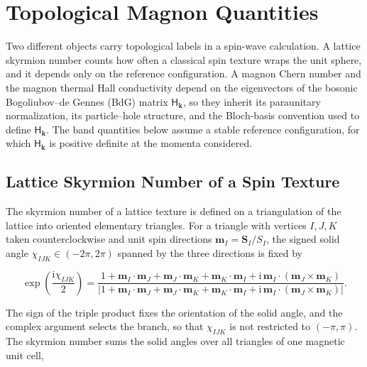 
\hypertarget{sec-lswt-topological-magnon-quantities}{%
\section{Topological Magnon Quantities}\label{sec-lswt-topological-magnon-quantities}}

Two different objects carry topological labels in a spin-wave calculation. A lattice skyrmion number counts how often a classical spin texture wraps the unit sphere, and it depends only on the reference configuration. A magnon Chern number and the magnon thermal Hall conductivity depend on the eigenvectors of the bosonic Bogoliubov--de Gennes (BdG) matrix \(\mathsf H_{\mathbf k}\), so they inherit its paraunitary normalization, its particle--hole structure, and the Bloch-basis convention used to define \(\mathsf H_{\mathbf k}\). The band quantities below assume a stable reference configuration, for which \(\mathsf H_{\mathbf k}\) is positive definite at the momenta considered.

\subsection{Lattice Skyrmion Number of a Spin Texture}

The skyrmion number of a lattice texture is defined on a triangulation of the lattice into oriented elementary triangles. For a triangle with vertices \(I,J,K\) taken counterclockwise and unit spin directions \(\mathbf m_I=\mathbf S_I/S_I\), the signed solid angle \(\chi_{IJK}\in(-2\pi,2\pi)\) spanned by the three directions is fixed by

\[
\exp\!\left(\frac{\mathrm i\chi_{IJK}}{2}\right)
=\frac{1+\mathbf m_I\cdot\mathbf m_J+\mathbf m_J\cdot\mathbf m_K+\mathbf m_K\cdot\mathbf m_I+\mathrm i\,\mathbf m_I\cdot(\mathbf m_J\times\mathbf m_K)}{\left|1+\mathbf m_I\cdot\mathbf m_J+\mathbf m_J\cdot\mathbf m_K+\mathbf m_K\cdot\mathbf m_I+\mathrm i\,\mathbf m_I\cdot(\mathbf m_J\times\mathbf m_K)\right|}.
\]

The sign of the triple product fixes the orientation of the solid angle, and the complex argument selects the branch, so that \(\chi_{IJK}\) is not restricted to \((-\pi,\pi)\). The skyrmion number sums the solid angles over all triangles of one magnetic unit cell,

